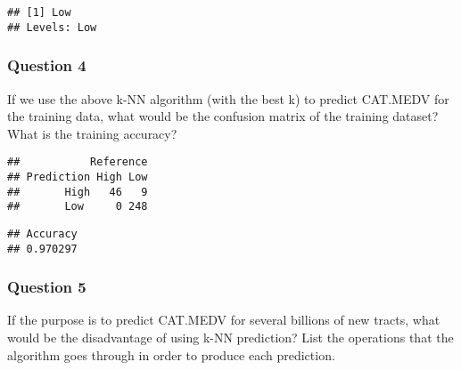 \documentclass[]{article}
\newenvironment{Shaded}{\begin{snugshade}}{\end{snugshade}}
\newcommand{\KeywordTok}[1]{\textcolor[rgb]{0.13,0.29,0.53}{\textbf{#1}}}
\newcommand{\DataTypeTok}[1]{\textcolor[rgb]{0.13,0.29,0.53}{#1}}
\newcommand{\DecValTok}[1]{\textcolor[rgb]{0.00,0.00,0.81}{#1}}
\newcommand{\StringTok}[1]{\textcolor[rgb]{0.31,0.60,0.02}{#1}}
\newcommand{\CommentTok}[1]{\textcolor[rgb]{0.56,0.35,0.01}{\textit{#1}}}
\newcommand{\OperatorTok}[1]{\textcolor[rgb]{0.81,0.36,0.00}{\textbf{#1}}}
\newcommand{\NormalTok}[1]{#1}
\begin{document}
\begin{verbatim}
## [1] Low
## Levels: Low
\end{verbatim}

\subsubsection{Question 4}\label{question-4}

If we use the above k-NN algorithm (with the best k) to predict CAT.MEDV
for the training data, what would be the confusion matrix of the
training dataset? What is the training accuracy?

\begin{Shaded}
\end{Shaded}

\begin{verbatim}
##           Reference
## Prediction High Low
##       High   46   9
##       Low     0 248
\end{verbatim}

\begin{Shaded}
\end{Shaded}

\begin{verbatim}
## Accuracy 
## 0.970297
\end{verbatim}

\subsubsection{Question 5}\label{question-5}

If the purpose is to predict CAT.MEDV for several billions of new
tracts, what would be the disadvantage of using k-NN prediction? List
the operations that the algorithm goes through in order to produce each
prediction.
\end{document}
